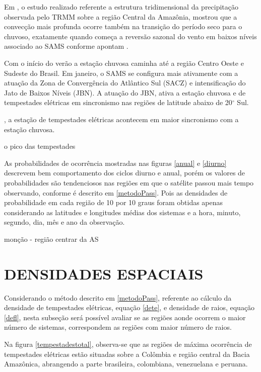 Em , o estudo realizado referente a estrutura tridimensional da precipitação observada pelo TRMM sobre a região Central da Amazônia, mostrou que a convecção mais profunda ocorre também na transição do período seco para o chuvoso, exatamente quando começa a reversão sazonal do vento em baixos níveis associado ao SAMS conforme apontam .

Com o início do verão a estação chuvosa caminha até a região Centro Oeste e Sudeste do Brasil. Em janeiro, o SAMS se configura mais ativamente com a atuação da Zona de Convergência do Atlântico Sul (SACZ)  e intensificação do Jato de Baixos Níveis (JBN).  A atuação do JBN, ativa a estação chuvosa e de tempestades elétricas em sincronismo nas regiões de latitude abaixo de 20$^{\circ}$ Sul. 


, a estação de tempestades elétricas acontecem em maior sincronismo com a estação chuvosa.


  

o pico das tempestades 






As probabilidades de ocorrência mostradas nas figuras \ref{anual} e \ref{diurno} descrevem bem comportamento dos ciclos diurno e anual, porém os valores de probabilidades são tendenciosos nas regiões em que o satélite passou mais tempo observando, conforme é descrito em \ref{metodoPass}. Pois as densidades de probabilidade em cada região de 10 por 10 graus foram obtidas apenas considerando as latitudes e longitudes médias dos sistemas e a hora, minuto, segundo, dia, mês e ano da observação.


monção - região centrar da AS

\section{DENSIDADES ESPACIAIS}


Considerando o método descrito em \ref{metodoPass}, referente ao cálculo da densidade de tempestades elétricas, equação \ref{dete}, e densidade de raios, equação \ref{defl}, nesta subseção será possível avaliar se as regiões aonde ocorrem o maior número de sistemas, correspondem as regiões com maior número de raios.

Na figura \ref{tempestadestotal}, observa-se que as regiões de máxima ocorrência de tempestades elétricas estão situadas sobre a Colômbia e região central da Bacia Amazônica, abrangendo a parte brasileira, colombiana, venezuelana e peruana.



